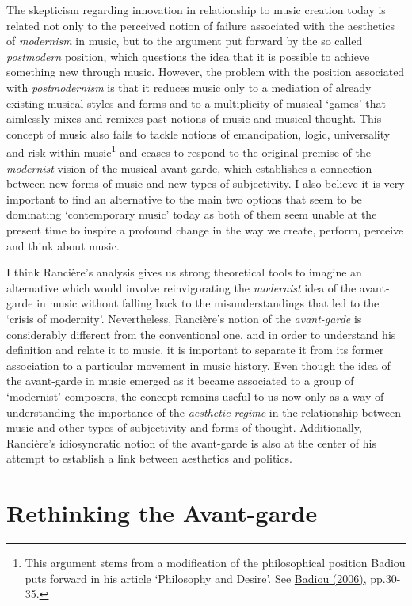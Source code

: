 The skepticism regarding innovation in relationship to music creation today is related not only to the perceived notion of failure associated with the aesthetics of \emph{modernism} in music, but to the argument put forward by the so called \emph{postmodern} position, which questions the idea that it is possible to achieve something new through music. However, the problem with the position associated with \emph{postmodernism} is that it reduces music only to a mediation of already existing musical styles and forms and to a multiplicity of musical `games' that aimlessly mixes and remixes past notions of music and musical thought. This concept of music also fails to tackle notions of emancipation, logic, universality and risk within music\footnote{This argument stems from a modification of the philosophical position Badiou puts forward in his article `Philosophy and Desire'. See \hyperlink{infthought}{Badiou (2006)}, pp.30-35.} and ceases to respond to the original premise of the \emph{modernist} vision of the musical avant-garde, which establishes a connection between new forms of music and new types of subjectivity. I also believe it is very important to find an alternative to the main two options that seem to be dominating `contemporary music' today as both of them seem unable at the present time to inspire a profound change in the way we create, perform, perceive and think about music.

I think Ranci\`{e}re's analysis gives us strong theoretical tools to imagine an alternative which would involve reinvigorating the \emph{modernist} idea of the avant-garde in music without falling back to the misunderstandings that led to the `crisis of modernity'. Nevertheless, Ranci\`{e}re's notion of the \emph{avant-garde} is considerably different from the conventional one, and in order to understand his definition and relate it to music, it is important to separate it from its former association to a particular movement in music history. Even though the idea of the avant-garde in music emerged as it became associated to a group of `modernist' composers, the concept remains useful to us now only as a way of understanding the importance of the \emph{aesthetic regime} in the relationship between music and other types of subjectivity and forms of thought. Additionally, Ranci\`{e}re's idiosyncratic notion of the avant-garde is also at the center of his attempt to establish a link between aesthetics and politics. 

\section{Rethinking the Avant-garde}

